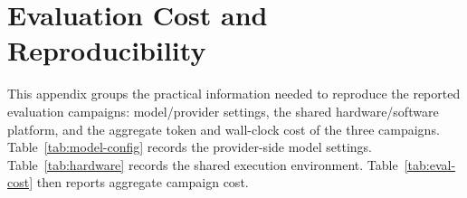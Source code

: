 
%

%


\section{Evaluation Cost and Reproducibility}
\label{sec:appendix-j}

This appendix groups the practical information needed to reproduce the reported
evaluation campaigns: model/provider settings, the shared hardware/software
platform, and the aggregate token and wall-clock cost of the three campaigns.
Table~\ref{tab:model-config} records the provider-side model settings.
Table~\ref{tab:hardware} records the shared execution environment.
Table~\ref{tab:eval-cost} then reports aggregate campaign cost.

